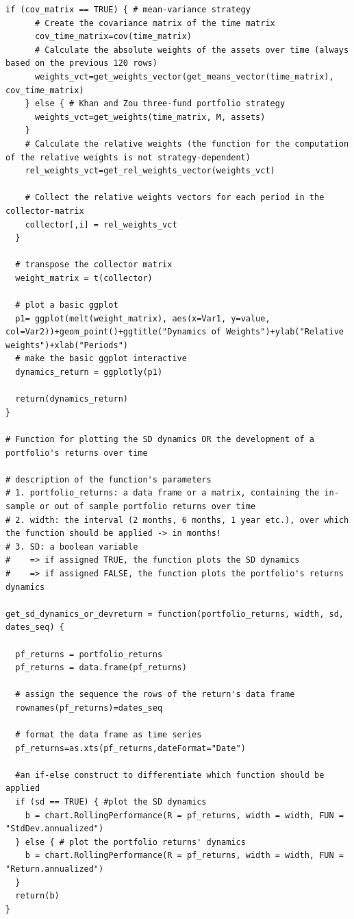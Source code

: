 \documentclass{article}
\begin{document}
\begin{lstlisting}[caption={This listing shows the entire code developed in R.}, label=code:1,frame=single]
    if (cov_matrix == TRUE) { # mean-variance strategy
      # Create the covariance matrix of the time matrix
      cov_time_matrix=cov(time_matrix)
      # Calculate the absolute weights of the assets over time (always based on the previous 120 rows)
      weights_vct=get_weights_vector(get_means_vector(time_matrix), cov_time_matrix)
    } else { # Khan and Zou three-fund portfolio strategy
      weights_vct=get_weights(time_matrix, M, assets)
    }
    # Calculate the relative weights (the function for the computation of the relative weights is not strategy-dependent)
    rel_weights_vct=get_rel_weights_vector(weights_vct)
    
    # Collect the relative weights vectors for each period in the collector-matrix
    collector[,i] = rel_weights_vct
  }
  
  # transpose the collector matrix
  weight_matrix = t(collector)
  
  # plot a basic ggplot
  p1= ggplot(melt(weight_matrix), aes(x=Var1, y=value, col=Var2))+geom_point()+ggtitle("Dynamics of Weights")+ylab("Relative weights")+xlab("Periods")
  # make the basic ggplot interactive
  dynamics_return = ggplotly(p1)
  
  return(dynamics_return)
}

# Function for plotting the SD dynamics OR the development of a portfolio's returns over time

# description of the function's parameters
# 1. portfolio_returns: a data frame or a matrix, containing the in-sample or out of sample portfolio returns over time
# 2. width: the interval (2 months, 6 months, 1 year etc.), over which the function should be applied -> in months!
# 3. SD: a boolean variable 
#    => if assigned TRUE, the function plots the SD dynamics
#    => if assigned FALSE, the function plots the portfolio's returns dynamics

get_sd_dynamics_or_devreturn = function(portfolio_returns, width, sd, dates_seq) {
  
  pf_returns = portfolio_returns
  pf_returns = data.frame(pf_returns)
  
  # assign the sequence the rows of the return's data frame
  rownames(pf_returns)=dates_seq
  
  # format the data frame as time series
  pf_returns=as.xts(pf_returns,dateFormat="Date")
  
  #an if-else construct to differentiate which function should be applied
  if (sd == TRUE) { #plot the SD dynamics
    b = chart.RollingPerformance(R = pf_returns, width = width, FUN = "StdDev.annualized")
  } else { # plot the portfolio returns' dynamics
    b = chart.RollingPerformance(R = pf_returns, width = width, FUN = "Return.annualized")
  }
  return(b)
}


\end{lstlisting}
\end{document}
